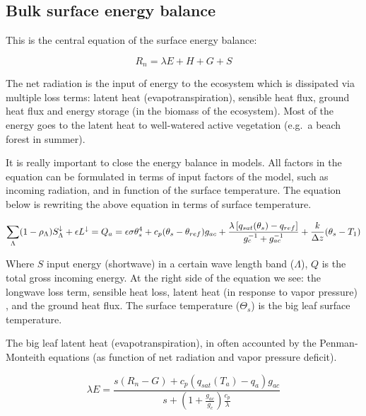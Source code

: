 \documentclass[
  12pt,
  oneside]{book}
\begin{document}
\hypertarget{bulk-surface-energy-balance}{%
\subsection{Bulk surface energy balance}\label{bulk-surface-energy-balance}}

This is the central equation of the surface energy balance:

\[
R_n = \lambda E + H + G +S
\]

The net radiation is the input of energy to the ecosystem which is dissipated via multiple loss terms: latent heat (evapotranspiration), sensible heat flux, ground heat flux and energy storage (in the biomass of the ecosystem). Most of the energy goes to the latent heat to well-watered active vegetation (e.g.~a beach forest in summer).

It is really important to close the energy balance in models. All factors in the equation can be formulated in terms of input factors of the model, such as incoming radiation, and in function of the surface temperature. The equation below is rewriting the above equation in terms of surface temperature.

\[
\sum_{\Lambda} (1 - \rho_{\Lambda} ) S^{\downarrow}_{\Lambda} + \epsilon L^{\downarrow} = Q_{a} \\ = \epsilon \sigma \theta_s^{4} + c_p ( \theta_s - \theta_{ref} ) g_{ac} + \frac{\lambda \left[ q_{sat} ( \theta_s ) - q_{ref} \right] }{ g_c^{-1} + g_{ac}^{-1}} + \frac{k}{\Delta z} (\theta_s - T_1)
\]

Where \(S\) input energy (shortwave) in a certain wave length band (\(\Lambda\)), \(Q\) is the total gross incoming energy. At the right side of the equation we see: the longwave loss term, sensible heat loss, latent heat (in response to vapor pressure) , and the ground heat flux. The surface temperature (\(\Theta_s\)) is the big leaf surface temperature.

The big leaf latent heat (evapotranspiration), in often accounted by the Penman-Monteith equations (as function of net radiation and vapor pressure deficit).

\[
\lambda E = \frac{s (R_n - G) + c_p \left(q_{sat}(T_a) - q_a \right) g_{ac}}{s + (1 + \frac{g_{ac}}{g_c}) \frac{c_p}{\lambda}}
\]
\end{document}
